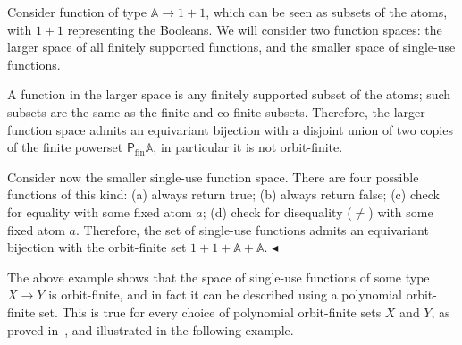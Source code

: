 \documentclass[10pt,a4paper]{amsart}
\numberwithin{equation}{section}
\theoremstyle{plain}
\newcommand{\powerset}{\mathsf P}
\newcommand{\atoms}{\mathbb A}
\newcommand{\exampleend}{$\blacktriangleleft$}
\begin{document}
\begin{example}\label{ex:first-single-use-function-space}
    Consider function of type $\atoms \to 1 + 1$, which can be seen as subsets of the atoms, with $1+1$ representing the Booleans. We will consider two function spaces: the larger space of all finitely supported functions, and the smaller space of single-use functions.
    
    A function in the larger space is any finitely supported subset of the atoms; such subsets are the same as the finite and co-finite subsets. Therefore, the larger function space admits an equivariant bijection with a disjoint union of two copies of the finite powerset $\powerset_{\text{fin}} \atoms$, in particular it is not orbit-finite.
    
    Consider now the smaller single-use function space. There are four possible functions of this kind: (a) always return true; (b) always return false; (c) check for equality with some fixed atom $a$; (d) check for disequality ($\neq$) with some fixed atom $a$.  Therefore,  the set of single-use functions  admits an equivariant bijection with the orbit-finite set $1 + 1 + \atoms + \atoms$.
    \exampleend
\end{example}


The above example shows that the space of single-use functions of some type $X \to Y$ is orbit-finite, and in fact it can be described using a polynomial orbit-finite set. This is true for every choice of polynomial orbit-finite sets $X$ and $Y$, as proved in~\cite[Theorem 5]{stefanski-phd}, and illustrated in the following example. 
\end{document}
